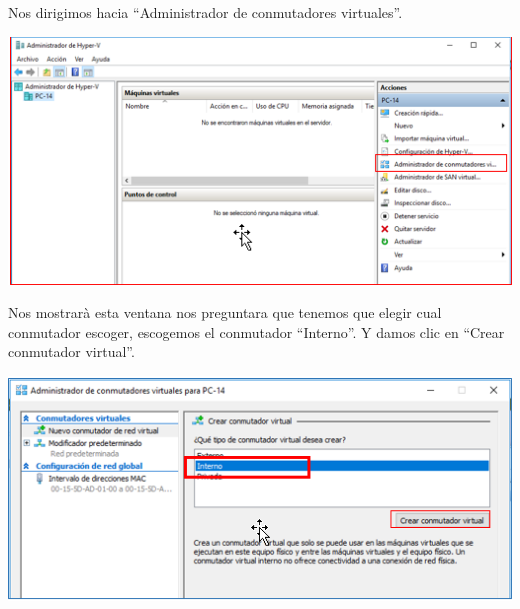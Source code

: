 \newpage

Nos dirigimos hacia “Administrador de conmutadores virtuales”. 
\begin{center}
	\includegraphics[width=17cm]{./Imagenes/11} 
\end{center}

\vspace{\baselineskip}

Nos mostrarà esta ventana nos preguntara que tenemos que elegir cual conmutador escoger, escogemos el conmutador “Interno”. Y damos clic en “Crear conmutador virtual”.
\begin{center}
	\includegraphics[width=14cm]{./Imagenes/12} 
\end{center} 

\vspace{\baselineskip}


